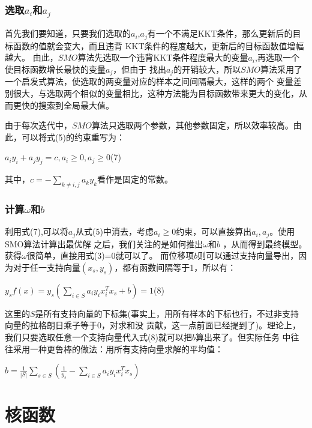 \documentclass[UTF8]{ctexart}
\begin{document}
{\subsubsection{\large{选取$a_i$和$a_j$}}
首先我们要知道，只要我们选取的$a_i$,$a_j$有一个不满足KKT条件，那么更新后的目标函数的值就会变大，而且违背
KKT条件的程度越大，更新后的目标函数值增幅越大。\newpage
由此，$SMO$算法先选取一个违背KKT条件程度最大的变量$a_i$,再选取一个使目标函数增长最快的变量$a_j$，但由于
找出$a_j$的开销较大，所以$SMO$算法采用了一个启发式算法，使选取的两变量对应的样本之间间隔最大，这样的两个
变量差别很大，与选取两个相似的变量相比，这种方法能为目标函数带来更大的变化，从而更快的搜索到全局最大值。\par
由于每次迭代中，$SMO$算法只选取两个参数，其他参数固定，所以效率较高。由此，可以将式(5)的约束重写为：\par
\begin{center}
    \Large{
        $a_iy_i+a_jy_j=c,a_i\geq0,a_j\geq0$\quad(7)
    }
\end{center}
其中，$c=-\sum_{k\neq i,j}a_ky_k$看作是固定的常数。
\subsubsection{\large{计算$\omega$和$b$}}
利用式(7),可以将$a_j$从式(5)中消去，考虑$a_i\geq 0$约束，可以直接算出$a_i,a_j$。使用SMO算法计算出最优解
之后，我们关注的是如何推出$\omega$和$b$ ，从而得到最终模型。获得$\omega$很简单，直接用式(3)=0就可以了。
而位移项$b$则可以通过支持向量导出，因为对于任一支持向量$(x_s,y_s)$，都有函数间隔等于1，所以有：\par
\begin{center}
    \Large{
        $y_sf(x)=y_s(\sum\limits_{i\in S}a_iy_ix_i^Tx_s+b)=1$\quad(8)
    }
\end{center}\par
这里的$S$是所有支持向量的下标集(事实上，用所有样本的下标也行，不过非支持向量的拉格朗日乘子等于0，对求和没
贡献，这一点前面已经提到了)。理论上，我们只要选取任意一个支持向量代入式(8)就可以把$b$算出来了。但实际任务
中往往采用一种更鲁棒的做法：用所有支持向量求解的平均值：
\begin{center}
    \Large{
        $b=\frac{1}{|S|}\sum\limits_{s\in S}(\frac{1}{y_s}-\sum\limits_{i\in S}a_iy_ix_i^Tx_s)$
        }
\end{center}\newpage
\section{核函数}
}
\end{document}
